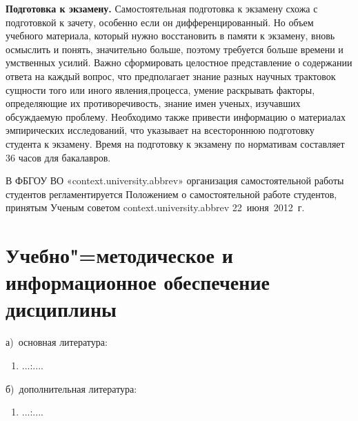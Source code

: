 \documentclass[12pt]{scrartcl}
\newcommand{\rdf}[2]{#2}
\newenvironment{rdfctx}[1]{}{}
\renewcommand{\paragraph}[1]{\par\textbf{#1}}
\begin{document}
\paragraph{Подготовка к экзамену.} Самостоятельная подготовка к экзамену схожа с
подготовкой к зачету, особенно если он дифференцированный. Но объем учебного
материала, который нужно восстановить в памяти к экзамену, вновь осмыслить и понять,
значительно больше, поэтому требуется больше времени и умственных усилий. Важно
сформировать целостное представление о содержании ответа на каждый вопрос, что
предполагает знание разных научных трактовок сущности того или иного явления,процесса, умение раскрывать факторы, определяющие их противоречивость, знание имен
ученых, изучавших обсуждаемую проблему. Необходимо также привести информацию о
материалах эмпирических исследований, что указывает на всестороннюю подготовку
студента к экзамену. Время на подготовку к экзамену по нормативам составляет 36 часов
для бакалавров.

В ФБГОУ ВО «{{context.university.abbrev}}» организация самостоятельной работы студентов
регламентируется Положением о самостоятельной работе студентов, принятым Ученым
советом {{context.university.abbrev}} 22~июня~2012~г.

\section{Учебно"=методическое и информационное обеспечение дисциплины}
\noindent а)\ основная литература:
\begin{rdfctx}{\rdfsetctx{list}{syll wpdd:itemList !wpdd:BaseReferenceList !wpdd:ItemList}}
  \begin{enumerate}
      \item \rdf{list ^schema:member !wpdd:ListItem !wpdd:Reference}{...\;:\;[текст]\;....} %
  \end{enumerate}
\end{rdfctx}

\noindent б)\ дополнительная литература:
\begin{rdfctx}{\rdfsetctx{list}{syll wpdd:itemList !wpdd:AuxReferenceList !wpdd:ItemList}}
\begin{enumerate}
      \item \rdf{list ^schema:member !wpdd:ListItem !wpdd:Reference}{...\;:\;[текст]\;....} %
\end{enumerate}
\end{rdfctx}
\end{document}
